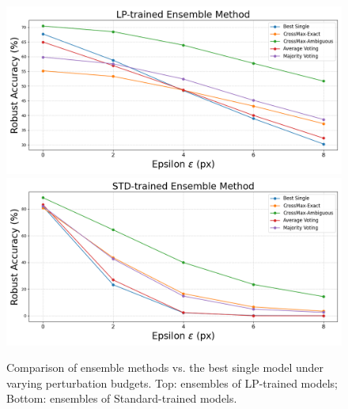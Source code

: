 \begin{figure}[htbp]
    \centering
    \includegraphics[width=1.0\textwidth]{images/Ensemble LP Performance.png}
    \includegraphics[width=1.0\textwidth]{images/Ensemble STD Performance.png}
    \caption{
    Comparison of ensemble methods vs. the best single model under varying perturbation budgets. 
    Top: ensembles of LP-trained models; Bottom: ensembles of Standard-trained models.
    }

    \label{fig:ensemble_performance}
\end{figure}

